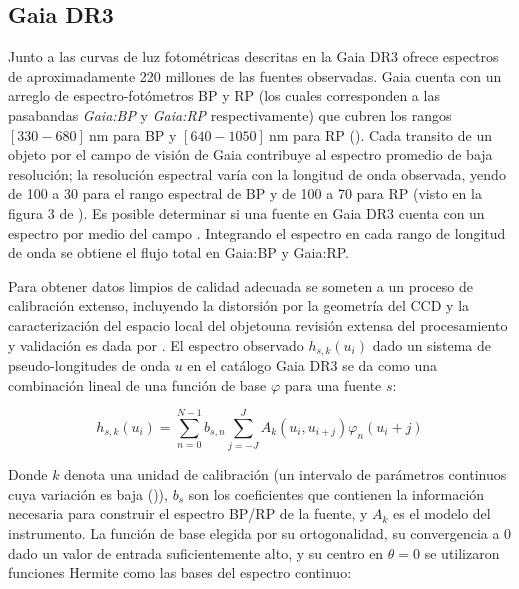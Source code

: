 \subsection{Gaia DR3}

Junto a las curvas de luz fotométricas descritas en la
 Gaia DR3 ofrece espectros de aproximadamente 220
millones de las fuentes observadas. Gaia cuenta con un arreglo de
espectro-fotómetros BP y RP (los cuales corresponden a las pasabandas
\textit{Gaia:BP} y \textit{Gaia:RP} respectivamente) que cubren los rangos $[330
- 680] \ \mathrm{nm}$ para BP y $[640 - 1050] \ \mathrm{nm}$ para RP
().
Cada transito de un objeto por el campo de visión de Gaia contribuye al espectro
promedio de baja resolución; la resolución espectral varía con la longitud de
onda observada, yendo de 100 a 30 para el rango espectral de BP y de 100 a 70
para RP (visto en la figura 3 de
).
Es posible determinar si una fuente en Gaia DR3 cuenta con un espectro por medio
del campo . Integrando el espectro en cada rango de
longitud de onda se obtiene el flujo total en Gaia:BP y Gaia:RP.

Para obtener datos limpios de calidad adecuada se someten a un proceso de
calibración extenso, incluyendo la distorsión por la geometría del CCD y la
caracterización del espacio local del objeto\textemdash una revisión extensa del
procesamiento y validación es dada por
. El
espectro observado $h_{s,k}(u_i)$ dado un sistema de pseudo-longitudes de onda
$u$ en el catálogo Gaia DR3 se da como una combinación lineal de una función de
base $\varphi$ para una fuente $s$:

\begin{eqfloat}[!ht]
    \begin{equation}
        h_{s,k}(u_i) = \sum_{n=0}^{N - 1} b_{s,n} \sum_{j = -J}^{J} A_k(u_i, u_{i+j}) \varphi_n(u_i+j)
    \end{equation}
\end{eqfloat}

Donde $k$ denota una unidad de calibración (un intervalo de parámetros continuos
cuya variación es baja
()),
$b_s$ son los coeficientes que contienen la información necesaria para construir
el espectro BP/RP de la fuente, y $A_k$ es el modelo del instrumento. La función
de base elegida por su ortogonalidad, su convergencia a 0 dado un valor de
entrada suficientemente alto, y su centro en $\theta = 0$ se utilizaron
funciones Hermite como las bases del espectro continuo:

